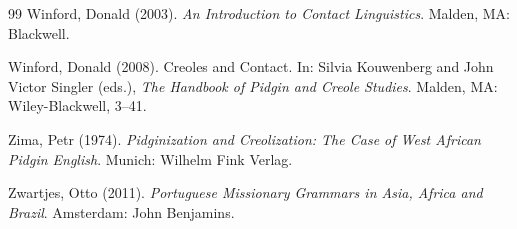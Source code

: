 \documentclass[12pt]{article}
\begin{document}
\begin{thebibliography}{99}
Winford, Donald (2003).
\textit{An Introduction to Contact Linguistics}.
Malden, MA: Blackwell.

Winford, Donald (2008).
Creoles and Contact.
In: Silvia Kouwenberg and John Victor Singler (eds.),
\textit{The Handbook of Pidgin and Creole Studies}.
Malden, MA: Wiley-Blackwell, 3--41.

Zima, Petr (1974).
\textit{Pidginization and Creolization: The Case of West African Pidgin English}.
Munich: Wilhelm Fink Verlag.

Zwartjes, Otto (2011).
\textit{Portuguese Missionary Grammars in Asia, Africa and Brazil}.
Amsterdam: John Benjamins.

\end{thebibliography}
\end{document}
